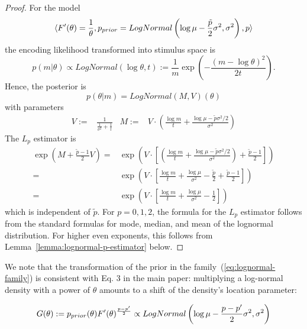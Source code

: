 \begin{proof}
    For the model
    \begin{equation}
        \langle F'(\theta) = \frac{1}{\theta}, p_{prior} = LogNormal\left(\log \mu - \frac{\tilde{p}}{2}\sigma^2, \sigma^2\right), {p}\rangle
    \end{equation}
    the encoding likelihood transformed into stimulus space is
    \begin{equation}
        p(m|\theta) \propto LogNormal(\log \theta, t) := \frac{1}{m} \exp(-\frac{(m - \log \theta)^2}{2t}).
    \end{equation}
    Hence, the posterior is
\begin{equation}
    p(\theta|m) = LogNormal(M, V)(\theta)
\end{equation}
with parameters
\begin{align*} 
V := &\frac{1}{\frac{1}{\sigma^2}+\frac{1}{t}} &
    M := &V \cdot \left(\frac{\log m}{t} + \frac{\log\mu - \tilde{p}\sigma^2/2}{\sigma^2}\right)
\end{align*}
The $L_{{p}}$ estimator is 
    \begin{align*}
        \exp(M + \frac{\tilde{p}-1}{2} V) =& \exp(V \cdot \left[\left(\frac{\log m}{t} + \frac{\log\mu - \tilde{p}\sigma^2/2}{\sigma^2}\right) + \frac{\tilde{p}-1}{2}\right]) \\
        =& \exp(V \cdot \left[\frac{\log m}{t} + \frac{\log\mu }{\sigma^2} - \frac{\tilde{p}}{2}  + \frac{\tilde{p}-1}{2}\right]) \\
        =& \exp(V \cdot \left[\frac{\log m}{t} + \frac{\log\mu }{\sigma^2}   - \frac{1}{2}\right])
    \end{align*}
    which is independent of $\tilde{p}$.
    For $p=0,1,2$, the formula for the $L_p$ estimator follows from the standard formulas for mode, median, and mean of the lognormal distribution.
    For higher even exponents, this follows from Lemma~\ref{lemma:lognormal-p-estimator} below.
    
    
\end{proof}
We note that the transformation of the prior in the family~(\ref{eq:lognormal-family}) is consistent with Eq. 3 in the main paper: multiplying a log-normal density with a power of $\theta$ amounts to a shift of the density's location parameter:
\begin{lemma}
\begin{align*}
  G(\theta) :=  p_{prior}(\theta) F'(\theta)^{\frac{p-p'}{2}} \propto LogNormal\left(\log\mu - \frac{p-p'}{2}\sigma^2, \sigma^2\right)
\end{align*}
\end{lemma}
